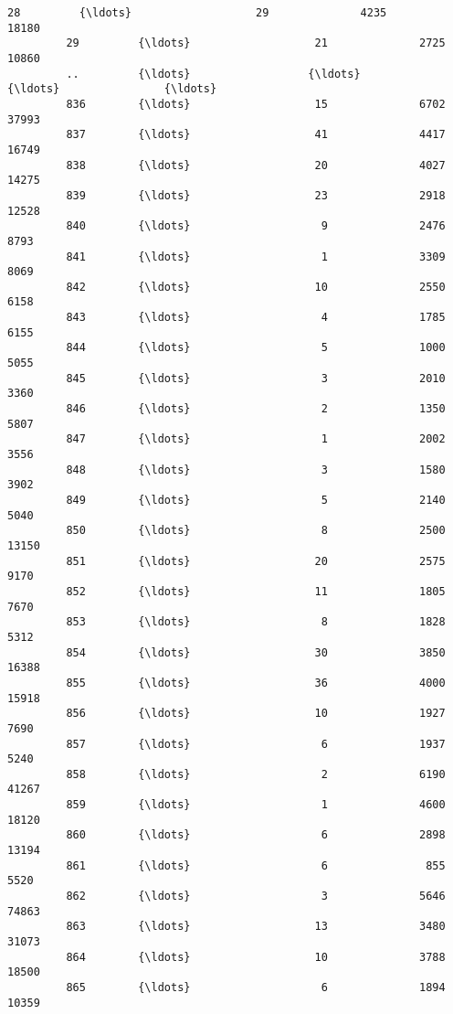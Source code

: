 \documentclass[11pt]{article}
\begin{document}
\begin{Verbatim}[commandchars=\\\{\}]
         28         {\ldots}                   29              4235              18180   
         29         {\ldots}                   21              2725              10860   
         ..         {\ldots}                  {\ldots}               {\ldots}                {\ldots}   
         836        {\ldots}                   15              6702              37993   
         837        {\ldots}                   41              4417              16749   
         838        {\ldots}                   20              4027              14275   
         839        {\ldots}                   23              2918              12528   
         840        {\ldots}                    9              2476               8793   
         841        {\ldots}                    1              3309               8069   
         842        {\ldots}                   10              2550               6158   
         843        {\ldots}                    4              1785               6155   
         844        {\ldots}                    5              1000               5055   
         845        {\ldots}                    3              2010               3360   
         846        {\ldots}                    2              1350               5807   
         847        {\ldots}                    1              2002               3556   
         848        {\ldots}                    3              1580               3902   
         849        {\ldots}                    5              2140               5040   
         850        {\ldots}                    8              2500              13150   
         851        {\ldots}                   20              2575               9170   
         852        {\ldots}                   11              1805               7670   
         853        {\ldots}                    8              1828               5312   
         854        {\ldots}                   30              3850              16388   
         855        {\ldots}                   36              4000              15918   
         856        {\ldots}                   10              1927               7690   
         857        {\ldots}                    6              1937               5240   
         858        {\ldots}                    2              6190              41267   
         859        {\ldots}                    1              4600              18120   
         860        {\ldots}                    6              2898              13194   
         861        {\ldots}                    6               855               5520   
         862        {\ldots}                    3              5646              74863   
         863        {\ldots}                   13              3480              31073   
         864        {\ldots}                   10              3788              18500   
         865        {\ldots}                    6              1894              10359   
         

\end{Verbatim}
\end{document}

